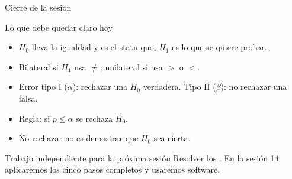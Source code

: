 \documentclass[aspectratio=169,10pt]{beamer}
\begin{document}
\begin{frame}{Cierre de la sesión}
  \begin{block}{Lo que debe quedar claro hoy}
    \begin{itemize}
      \item $H_0$ lleva la igualdad y es el statu quo; $H_1$ es lo que se
            quiere probar.
      \item Bilateral si $H_1$ usa $\neq$; unilateral si usa $>$ o $<$.
      \item Error tipo I ($\alpha$): rechazar una $H_0$ verdadera. Tipo II
            ($\beta$): no rechazar una falsa.
      \item Regla: si $p\le\alpha$ se rechaza $H_0$.
      \item No rechazar no es demostrar que $H_0$ sea cierta.
    \end{itemize}
  \end{block}

  \vspace{0.2cm}
  \begin{alertblock}{Trabajo independiente para la próxima sesión}
    \footnotesize
    Resolver los . En la sesión
    14 aplicaremos los cinco pasos completos y usaremos software.
  \end{alertblock}
\end{frame}
\end{document}

